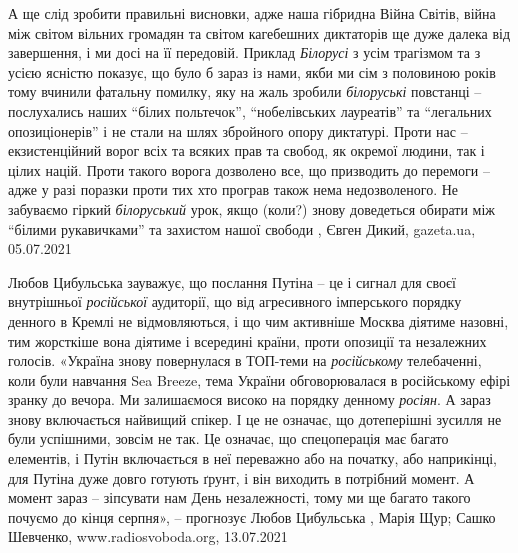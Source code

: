 А ще слід зробити правильні висновки, адже наша гібридна Війна Світів, війна
між світом вільних громадян та світом кагебешних диктаторів ще дуже далека від
завершення, і ми досі на її передовій. Приклад \emph{Білорусі} з усім трагізмом та з
усією ясністю показує, що було б зараз із нами, якби ми сім з половиною років
тому вчинили фатальну помилку, яку на жаль зробили \emph{білоруські} повстанці –
послухались наших \enquote{білих польтечок}, \enquote{нобелівських лауреатів} та \enquote{легальних
опозиціонерів} і не стали на шлях збройного опору диктатурі. Проти нас –
екзистенційний ворог всіх та всяких прав та свобод, як окремої людини, так і
цілих націй. Проти такого ворога дозволено все, що призводить до перемоги –
адже у разі поразки проти тих хто програв також нема недозволеного. Не
забуваємо гіркий \emph{білоруський} урок, якщо (коли?) знову доведеться обирати між
\enquote{білими рукавичками} та захистом нашої свободи
, 
Євген Дикий, gazeta.ua, 05.07.2021

Любов Цибульська зауважує, що послання Путіна – це і сигнал для своєї
внутрішньої \emph{російської} аудиторії, що від агресивного імперського порядку
денного в Кремлі не відмовляються, і що чим активніше Москва діятиме назовні,
тим жорсткіше вона діятиме і всередині країни, проти опозиції та незалежних
голосів.  «Україна знову повернулася в ТОП-теми на \emph{російському} телебаченні,
коли були навчання Sea Breeze, тема України обговорювалася в російському ефірі
зранку до вечора. Ми залишаємося високо на порядку денному \emph{росіян}. А зараз
знову включається найвищий спікер. І це не означає, що дотеперішні зусилля не
були успішними, зовсім не так. Це означає, що спецоперація має багато
елементів, і Путін включається в неї переважно або на початку, або наприкінці,
для Путіна дуже довго готують ґрунт, і він виходить в потрібний момент. А
момент зараз – зіпсувати нам День незалежності, тому ми ще багато такого
почуємо до кінця серпня», – прогнозує Любов Цибульська
, 
Марія Щур; Сашко Шевченко, www.radiosvoboda.org, 13.07.2021

